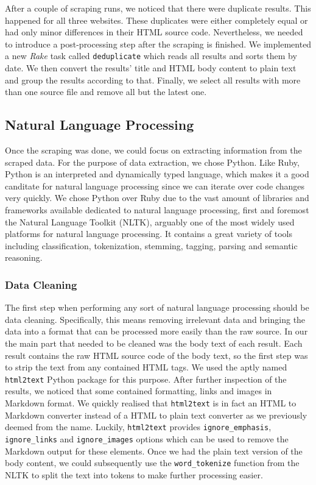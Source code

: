\documentclass[runningheads]{llncs}
\begin{document}
After a couple of scraping runs, we noticed that there were duplicate results. This happened for all three websites. These duplicates were either completely equal or had only minor differences in their HTML source code. Nevertheless, we needed to introduce a post-processing step after the scraping is finished. We implemented a new \textit{Rake} task called \texttt{deduplicate} which reads all results and sorts them by date. We then convert the results' title and HTML body content to plain text and group the results according to that. Finally, we select all results with more than one source file and remove all but the latest one.

\subsection{Natural Language Processing}
\label{sub:natural_language_processing}

Once the scraping was done, we could focus on extracting information from the scraped data. For the purpose of data extraction, we chose Python. Like Ruby, Python is an interpreted and dynamically typed language, which makes it a good canditate for natural language processing since we can iterate over code changes very quickly. We chose Python over Ruby due to the vast amount of libraries and frameworks available dedicated to natural language processing, first and foremost the Natural Language Toolkit (NLTK), arguably one of the most widely used platforms for natural language processing. It contains a great variety of tools including classification, tokenization, stemming, tagging, parsing and semantic reasoning. \cite{nltk}

\subsubsection{Data Cleaning}
\label{subsub:data_cleaning}

The first step when performing any sort of natural language processing should be data cleaning. Specifically, this means removing irrelevant data and bringing the data into a format that can be processed more easily than the raw source. In our the main part that needed to be cleaned was the body text of each result. Each result contains the raw HTML source code of the body text, so the first step was to strip the text from any contained HTML tags. We used the aptly named \texttt{html2text} Python package for this purpose. After further inspection of the results, we noticed that some contained formatting, links and images in Markdown format. We quickly realised that \texttt{html2text} is in fact an HTML to Markdown converter instead of a HTML to plain text converter as we previously deemed from the name. Luckily, \texttt{html2text} provides \texttt{ignore\_emphasis}, \texttt{ignore\_links} and \texttt{ignore\_images} options which can be used to remove the Markdown output for these elements. Once we had the plain text version of the body content, we could subsequently use the \texttt{word\_tokenize} function from the NLTK to split the text into tokens to make further processing easier.
\end{document}
